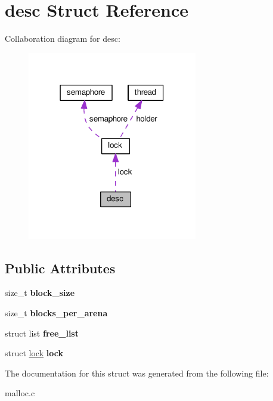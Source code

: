 \hypertarget{structdesc}{}\section{desc Struct Reference}
\label{structdesc}


Collaboration diagram for desc\+:
\nopagebreak
\begin{figure}[H]
\begin{center}
\leavevmode
\includegraphics[width=210pt]{structdesc__coll__graph}
\end{center}
\end{figure}
\subsection*{Public Attributes}
\begin{DoxyCompactItemize}
\item 
size\+\_\+t {\bfseries block\+\_\+size}\hypertarget{structdesc_a069c5d50b953f029c330020ca4735731}{}\label{structdesc_a069c5d50b953f029c330020ca4735731}

\item 
size\+\_\+t {\bfseries blocks\+\_\+per\+\_\+arena}\hypertarget{structdesc_ade728d0cc6c3b71571e8aaf4301863e2}{}\label{structdesc_ade728d0cc6c3b71571e8aaf4301863e2}

\item 
struct list {\bfseries free\+\_\+list}\hypertarget{structdesc_a0b6c63f462b9c00a0241d03ea05b192e}{}\label{structdesc_a0b6c63f462b9c00a0241d03ea05b192e}

\item 
struct \hyperlink{structlock}{lock} {\bfseries lock}\hypertarget{structdesc_a3f87cf0070aa73d4d9739648a217992b}{}\label{structdesc_a3f87cf0070aa73d4d9739648a217992b}

\end{DoxyCompactItemize}


The documentation for this struct was generated from the following file\+:\begin{DoxyCompactItemize}
\item 
malloc.\+c\end{DoxyCompactItemize}
